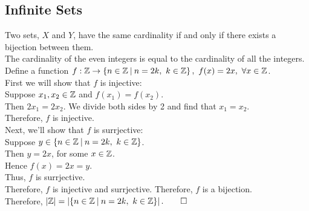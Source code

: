 \documentclass{report}
\begin{document}
\subsection*{Infinite Sets}
Two sets, $X$ and $Y$, have the same cardinality if and only if there exists a bijection between them. \\

\Lemma The cardinality of the even integers is equal to the cardinality of all the integers.
\proof Define a function $f:\bbz\to\braces{n\in\bbz\suchthat n=2k,\ k\in\bbz},\ f(x)=2x,\ \forall x\in\bbz$. \\
First we will show that $f$ is injective: \\
Suppose $x_1,x_2\in\mathbb{Z}$ and $f(x_1)=f(x_2)$. \\
Then $2x_1 = 2x_2$. We divide both sides by 2 and find that $x_1=x_2$. \\
Therefore, $f$ is injective. \\
Next, we'll show that $f$ is surrjective: \\
Suppose $y\in\braces{n\in\bbz\suchthat n=2k,\ k\in\bbz}$. \\
Then $y=2x$, for some $x\in\mathbb{Z}$. \\
Hence $f(x) = 2x = y$. \\
Thus, $f$ is surrjective. \\
Therefore, $f$ is injective and surrjective. Therefore, $f$ is a bijection. \\
Therefore, $\abs{\bbz} = \abs{\braces{n\in\bbz\suchthat n=2k,\ k\in\bbz}}. \QED$
	
\end{document}
